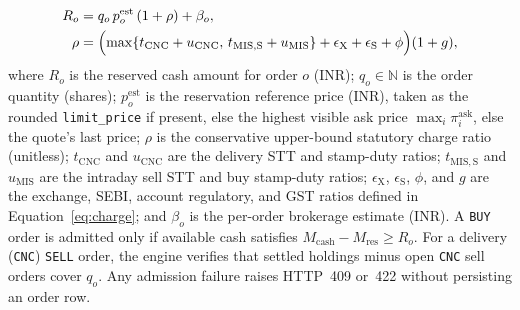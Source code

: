 \documentclass[journal,onecolumn,10pt]{IEEEtran}
\begin{document}
\begin{equation}
\begin{aligned}
R_o &= q_o\,p^{\mathrm{est}}_o\,(1+\rho)+\beta_o,\\
\rho &= \Bigl(\max\{t_{\mathrm{CNC}}+u_{\mathrm{CNC}},\,t_{\mathrm{MIS,S}}+u_{\mathrm{MIS}}\} + \epsilon_{\mathrm{X}}+\epsilon_{\mathrm{S}}+\phi\Bigr)(1+g),
\end{aligned}
\label{eq:reserve}
\end{equation}
where $R_o$ is the reserved cash amount for order $o$ (INR); $q_o\in\mathbb{N}$ is the order quantity (shares); $p^{\mathrm{est}}_o$ is the reservation reference price (INR), taken as the rounded \texttt{limit\_price} if present, else the highest visible ask price $\max_i \pi^{\mathrm{ask}}_i$, else the quote's last price; $\rho$ is the conservative upper-bound statutory charge ratio (unitless); $t_{\mathrm{CNC}}$ and $u_{\mathrm{CNC}}$ are the delivery STT and stamp-duty ratios; $t_{\mathrm{MIS,S}}$ and $u_{\mathrm{MIS}}$ are the intraday sell STT and buy stamp-duty ratios; $\epsilon_{\mathrm{X}}$, $\epsilon_{\mathrm{S}}$, $\phi$, and $g$ are the exchange, SEBI, account regulatory, and GST ratios defined in Equation~\eqref{eq:charge}; and $\beta_o$ is the per-order brokerage estimate (INR). A \texttt{BUY} order is admitted only if available cash satisfies $M_{\mathrm{cash}} - M_{\mathrm{res}} \ge R_o$. For a delivery (\texttt{CNC}) \texttt{SELL} order, the engine verifies that settled holdings minus open \texttt{CNC} sell orders cover $q_o$. Any admission failure raises HTTP~409 or~422 without persisting an order row.
\end{document}
